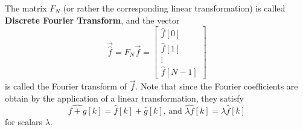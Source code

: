 \documentclass[12pt]{report}
\theoremstyle{plain}
\begin{document}
The matrix $F_N$ (or rather the corresponding linear transformation) is called \textbf{Discrete Fourier Transform}, and the vector
\[\vec{\hat f} = F_N \vec f =
\left[
\begin{matrix}
	\hat f[0] \\
	\hat f[1] \\
	\vdots \\
	\hat f[N-1]
\end{matrix}
\right]
\]
is called the Fourier transform of $\vec f$. Note that since the Fourier coefficients are obtain by the application of a linear transformation, they satisfy
\begin{equation} \label{hat is linear}
\widehat{f + g}[k] = \hat f[k] + \hat g[k] \text{, and }\widehat{\lambda f}[k] = \lambda \hat f[k]
\end{equation}
for scalars $\lambda$.
\end{document}
